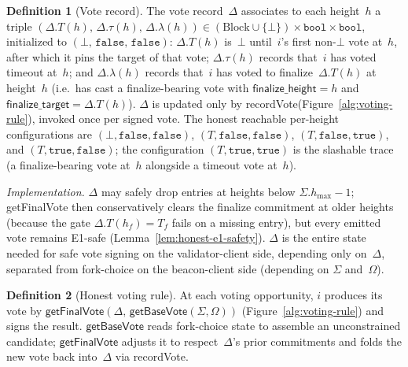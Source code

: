 \documentclass{article}
\newcommand{\finalizeHeight}{\mathsf{finalize\_height}}
\newcommand{\finalizeTarget}{\mathsf{finalize\_target}}
\newcommand{\hmax}{\ensuremath{h_{\max}}\xspace}
\newcommand{\getBaseVote}{\textsf{getBaseVote}\xspace}
\newcommand{\getFinalVote}{\textsf{getFinalVote}\xspace}
\newcommand{\recordVote}{\textsf{recordVote}\xspace}
\theoremstyle{plain}
\theoremstyle{definition}
\newtheorem{definition}{Definition}
\theoremstyle{remark}
\begin{document}
\begin{definition}[Vote record]\label{def:voterecord}
The vote record~$\Delta$ associates to each height~$h$ a triple $(\Delta.T(h),\, \Delta.\tau(h),\, \Delta.\lambda(h)) \in (\mathrm{Block} \cup \{\bot\}) \times \mathtt{bool} \times \mathtt{bool}$, initialized to $(\bot,\, \mathtt{false},\, \mathtt{false})$:
$\Delta.T(h)$ is~$\bot$ until~$i$'s first non-$\bot$ vote at~$h$, after which it pins the target of that vote; $\Delta.\tau(h)$ records that~$i$ has voted timeout at~$h$; and $\Delta.\lambda(h)$ records that~$i$ has voted to finalize~$\Delta.T(h)$ at height~$h$ (i.e.\ has cast a finalize-bearing vote with $\finalizeHeight = h$ and $\finalizeTarget = \Delta.T(h)$).
$\Delta$ is updated only by \recordVote (Figure~\ref{alg:voting-rule}), invoked once per signed vote.
The honest reachable per-height configurations are $(\bot, \mathtt{false}, \mathtt{false})$, $(T, \mathtt{false}, \mathtt{false})$, $(T, \mathtt{false}, \mathtt{true})$, and $(T, \mathtt{true}, \mathtt{false})$; the configuration $(T, \mathtt{true}, \mathtt{true})$ is the slashable trace (a finalize-bearing vote at~$h$ alongside a timeout vote at~$h$).

\smallskip
\noindent\emph{Implementation.}
$\Delta$ may safely drop entries at heights below $\Sigma.\hmax - 1$; \getFinalVote then conservatively clears the finalize commitment at older heights (because the gate $\Delta.T(h_f) = T_f$ fails on a missing entry), but every emitted vote remains E1-safe (Lemma~\ref{lem:honest-e1-safety}).
$\Delta$ is the entire state needed for safe vote signing on the validator-client side, depending only on~$\Delta$, separated from fork-choice on the beacon-client side (depending on $\Sigma$ and~$\Omega$).
\end{definition}

\begin{definition}[Honest voting rule]\label{def:voting-rule}
At each voting opportunity, $i$ produces its vote by $\getFinalVote(\Delta,\, \getBaseVote(\Sigma, \Omega))$ (Figure~\ref{alg:voting-rule}) and signs the result.
$\getBaseVote$ reads fork-choice state to assemble an unconstrained candidate; $\getFinalVote$ adjusts it to respect~$\Delta$'s prior commitments and folds the new vote back into~$\Delta$ via \recordVote.
\end{definition}
\end{document}
